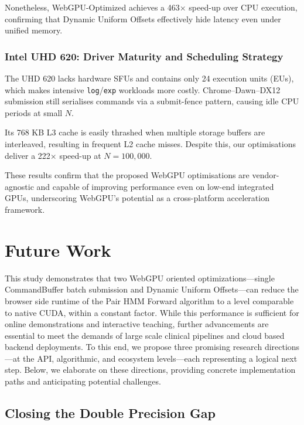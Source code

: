 \documentclass[PhD]{PHlab-thesis}
\begin{document}
Nonetheless, WebGPU-Optimized achieves a 463$\times$ speed-up over CPU execution, confirming that Dynamic Uniform Offsets effectively hide latency even under unified memory.

\subsection{Intel UHD 620: Driver Maturity and Scheduling Strategy}
The UHD 620 lacks hardware SFUs and contains only 24 execution units (EUs), which makes intensive \texttt{log}/\texttt{exp} workloads more costly. Chrome–Dawn–DX12 submission still serialises commands via a submit-fence pattern, causing idle CPU periods at small $N$.

Its 768 KB L3 cache is easily thrashed when multiple storage buffers are interleaved, resulting in frequent L2 cache misses. Despite this, our optimisations deliver a 222$\times$ speed-up at $N = 100,000$.

These results confirm that the proposed WebGPU optimisations are vendor-agnostic and capable of improving performance even on low-end integrated GPUs, underscoring WebGPU's potential as a cross-platform acceleration framework.



\chapter{Future Work}

This study demonstrates that two WebGPU oriented optimizations—single CommandBuffer batch submission and Dynamic Uniform Offsets—can reduce the browser side runtime of the Pair HMM Forward algorithm to a level comparable to native CUDA, within a constant factor. While this performance is sufficient for online demonstrations and interactive teaching, further advancements are essential to meet the demands of large scale clinical pipelines and cloud based backend deployments. To this end, we propose three promising research directions—at the API, algorithmic, and ecosystem levels—each representing a logical next step. Below, we elaborate on these directions, providing concrete implementation paths and anticipating potential challenges.

\section{Closing the Double Precision Gap}
\end{document}
